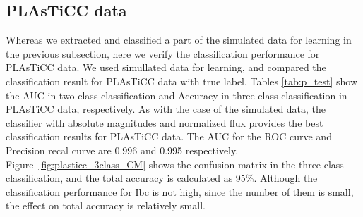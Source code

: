 \documentclass[useamsfonts]{pasj01}
\begin{document}
\subsection{PLAsTiCC data}
Whereas we extracted and classified a part of the simulated data for learning in the previous subsection, here we verify the classification performance for PLAsTiCC data.
We used simullated data for learning, and compared the classification result for PLAsTiCC data with true label.
Tables \ref{tab:p_test} show the AUC in two-class classification and Accuracy in three-class classification in PLAsTiCC data, respectively.
As with the case of the simulated data, the classifier with absolute magnitudes and normalized flux provides the best classification results for PLAsTiCC data.
The AUC for the ROC curve and Precision recal curve are 0.996 and 0.995 respectively.
Figure\ \ref{fig:plasticc_3class_CM} shows the confusion matrix in the three-class classification, and the total accuracy is calculated as 95\%.
Although the classification performance for Ibc is not high, since the number of them is small, the effect on total accuracy is relatively small.
%
%
%
\end{document}
